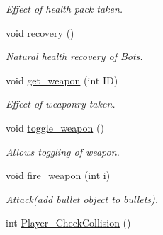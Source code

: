\begin{DoxyCompactItemize}
\begin{DoxyCompactList}\small\item\em Effect of health pack taken. \end{DoxyCompactList}\item 
\hypertarget{classbots_a8aba8237e3fd990f8b131dadc52f4c49}{void \hyperlink{classbots_a8aba8237e3fd990f8b131dadc52f4c49}{recovery} ()}\label{classbots_a8aba8237e3fd990f8b131dadc52f4c49}

\begin{DoxyCompactList}\small\item\em Natural health recovery of Bots. \end{DoxyCompactList}\item 
\hypertarget{classbots_a264b2afbb99934a8d2925bbb66a7c7c3}{void \hyperlink{classbots_a264b2afbb99934a8d2925bbb66a7c7c3}{get\+\_\+weapon} (int I\+D)}\label{classbots_a264b2afbb99934a8d2925bbb66a7c7c3}

\begin{DoxyCompactList}\small\item\em Effect of weaponry taken. \end{DoxyCompactList}\item 
\hypertarget{classbots_acd5b19e2cc646cf5557339b837369ada}{void \hyperlink{classbots_acd5b19e2cc646cf5557339b837369ada}{toggle\+\_\+weapon} ()}\label{classbots_acd5b19e2cc646cf5557339b837369ada}

\begin{DoxyCompactList}\small\item\em Allows toggling of weapon. \end{DoxyCompactList}\item 
\hypertarget{classbots_a22a03965570f88b9e44e2d648e959f2d}{void \hyperlink{classbots_a22a03965570f88b9e44e2d648e959f2d}{fire\+\_\+weapon} (int i)}\label{classbots_a22a03965570f88b9e44e2d648e959f2d}

\begin{DoxyCompactList}\small\item\em Attack(add bullet object to bullets). \end{DoxyCompactList}\item 
\hypertarget{classbots_a638b6976e5e76c3bebb5d72b76463d74}{int \hyperlink{classbots_a638b6976e5e76c3bebb5d72b76463d74}{Player\+\_\+\+Check\+Collision} ()}\label{classbots_a638b6976e5e76c3bebb5d72b76463d74}


\end{DoxyCompactItemize}
